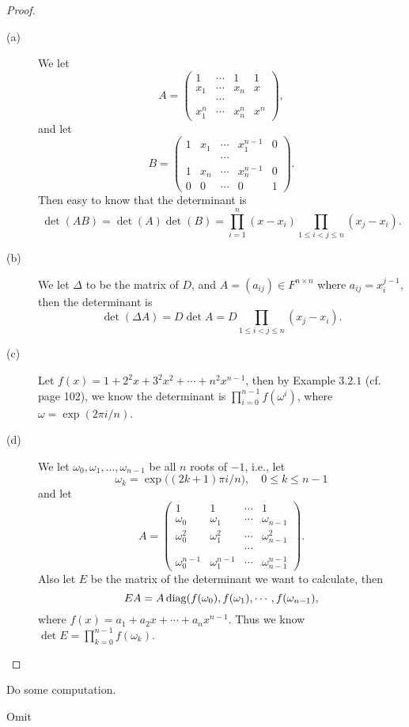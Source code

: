 \begin{proof}
	\begin{description}
	\item[(a)]
	We let 
	\[A=\begin{pmatrix}1&\cdots&1&1\\x_1&\cdots&x_n& x\\ &\cdots& & \\x_1^n&\cdots&x_n^n&x^n
	\end{pmatrix},\]
	and let
	\[B=\begin{pmatrix}1&x_1&\cdots&x_1^{n-1}&0\\
	& & \cdots& & \\
	1&x_n&\cdots&x_n^{n-1}&0\\
	0&0&\cdots&0&1\end{pmatrix}.\]
	Then easy to know that the determinant is \[\det(AB)=\det(A)\det(B)=\prod_{i=1}^n(x-x_i)\prod_{1\leq i<j\leq n}(x_j-x_i).\]
	\item[(b)]
	We let $\Delta$ to be the matrix of $D$, and $A=(a_{ij})\in F^{n\times n}$ where $a_{ij}=x_i^{j-1}$, then the determinant is 
	\[\det(\Delta A)=D\det A=D \prod_{1\leq i<j\leq n}(x_j-x_i).\]
	\item[(c)]
	Let $f(x)=1+2^2x+3^2x^2+\cdots+n^2x^{n-1}$, then by Example $3.2.1$ (cf. page 102), we know the determinant is $\prod_{i=0}^{n-1}f(\omega^i)$, where $\omega=\exp(2\pi i/n)$.
	\item[(d)]
	We let $\omega_0,\omega_1,\ldots,\omega_{n-1}$ be all $n$ roots of $-1$, i.e., let
	\[\omega_k=\exp\big((2k+1)\pi i/n\big),\quad 0\leq k\leq n-1\]
	and let 
	\[A=\begin{pmatrix}1 &1&\cdots&1\\\omega_0&\omega_1&\cdots&\omega_{n-1}\\
	\omega_0^2&\omega_1^2&\cdots&\omega_{n-1}^2\\& & \cdots&\\
	\omega_0^{n-1}&\omega_1^{n-1}&\cdots&\omega_{n-1}^{n-1}\end{pmatrix}.\]
	Also let $E$ be the matrix of the determinant we want to calculate, then
	\[EA=A\operatorname*{diag}(f(\omega_0),f(\omega_1),\cdots,f(\omega_{n-1}),\]
	where $f(x)=a_1+a_2x+\cdots+a_n x^{n-1}$.
	Thus we know $\det E=\prod_{k=0}^{n-1} f(\omega_k)$.
	\end{description}
\end{proof}
\begin{pro}%
	Do some computation.
\end{pro}

\begin{pro}%
	Omit
\end{pro}

